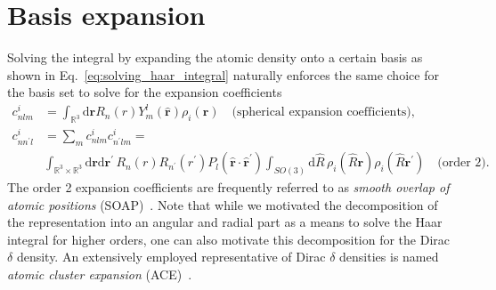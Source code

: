 

\section{Basis expansion}
Solving the integral by expanding the atomic density onto a certain basis as shown in Eq.~\eqref{eq:solving_haar_integral} naturally enforces the same choice for the basis set to solve for the expansion coefficients
\begin{subequations}
\label{eq:acdc_expansion}
\begin{align}
    \label{eq:gaussian_expansion}
    c^i_{nlm} &= \int_{\mathbb{R}^3}\mathrm{d}\mathbf{r} R_n(r)Y_m^l(\hat{\mathbf{r}})\rho_i(\mathbf{r})\quad\textrm{(spherical expansion coefficients),}\\
    c^i_{nn^\prime l} &= \sum_m c^i_{nlm}c^i_{n^\prime lm} = \nonumber \\
    \label{eq:soap_expansion}
                         &\int_{\mathbb{R}^3\times\mathbb{R}^3}\mathrm{d}\mathbf{r}\mathrm{d}\mathbf{r}^\prime\, R_n(r)R_{n^\prime}(r^\prime)P_l(\hat{\mathbf{r}}\cdot\hat{\mathbf{r}}^\prime) \int_{SO(3)}\mathrm{d}\hat{R}\,\rho_i(\hat{R}\mathbf{r})\rho_i(\hat{R}\mathbf{r}^\prime)\quad\textrm{(order 2)}.
\end{align}
\end{subequations}
The order 2 expansion coefficients are frequently referred to as \emph{smooth overlap of atomic positions} (SOAP)~\cite{bart+13prb}.
Note that while we motivated the decomposition of the representation into an angular and radial part as a means to solve the Haar integral for higher orders, one can also motivate this decomposition for the Dirac $\delta$ density.
An extensively employed representative of Dirac $\delta$ densities is named \emph{atomic cluster expansion} (ACE)~\cite{drautz2019atomic}.

